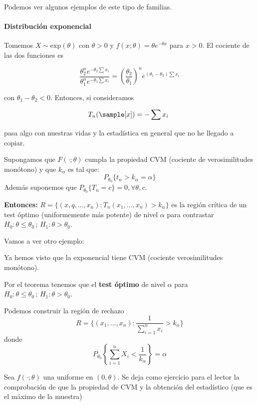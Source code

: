\documentclass{apuntes}
\begin{document}
Podemos ver algunos ejemplos de este tipo de familias.

\paragraph{Distribución exponencial}

Tomemos $X\sim \text{exp}(θ)$ con $θ>0$ y $f(x;θ) = θe^{-θx}$ para $x>0$. El cociente de las dos funciones es

\[ \frac{θ_2^ne^{-θ_2\sum x_i}}{θ_1^ne^{-θ_1\sum x_i}} = \left(\frac{θ_2}{θ_1}\right)^ne^{(θ_1-θ_2)\sum x_i } \]

con $θ_1-θ_2 < 0$. Entonces, si consideramos

\[ T_n(\sample[x]) = -\sum x_i \] 

pasa algo con nuestras vidas y la estadística en general que no he llegado a copiar.

\begin{theorem}\label{thmNeymanPearson2}
Supongamos que $F(\cdot;\theta)$ cumpla la propiedad CVM (cociente de verosimilitudes monótono) y que $k_{\alpha}$ es tal que:
\[P_{\theta_0} \{t_n > k_{\alpha} = \alpha\}\]
Además suponemos que $P_{\theta_0} \{T_n = c\} = 0, \forall \theta,c$. 

\textbf{Entonces:} $R=\{(x,q,...,x_n): T_n(x_1,...,x_n) > k_{\alpha}\}$ es la región crítica de un test óptimo (uniformemente más potente) de nivel $\alpha$ para contrastar $H_0: \theta \leq \theta_0\,;\, H_1: \theta > \theta_0$.
\end{theorem}

Vamos a ver otro ejemplo:

\begin{example}
Ya hemos visto que la exponencial tiene CVM (cociente verosimilitudes monótono).

Por el teorema tenemos que el \textbf{test óptimo} de nivel $\alpha$ para $H_0: \theta \leq \theta_0\,;\, H_1: \theta > \theta_0$.

Podemos construir la región de rechazo 
\[R = \{(x_1,...,x_n): \frac{1}{\sum_{i=1}^n x_i} > k_{\alpha}\}\] donde \[P_{\theta_0} \left\{\sum_{i=1}^n X_i < \frac{1}{k_{\alpha}}\right\} = \alpha\]
\end{example}

\begin{example}
Sea $f(\cdot;\theta)$ una uniforme en $(0,\theta)$.
Se deja como ejercicio para el lector la comprobación de que la propiedad de CVM y la obtención del estadístico (que es el máximo de la muestra)
\end{example}
\end{document}
